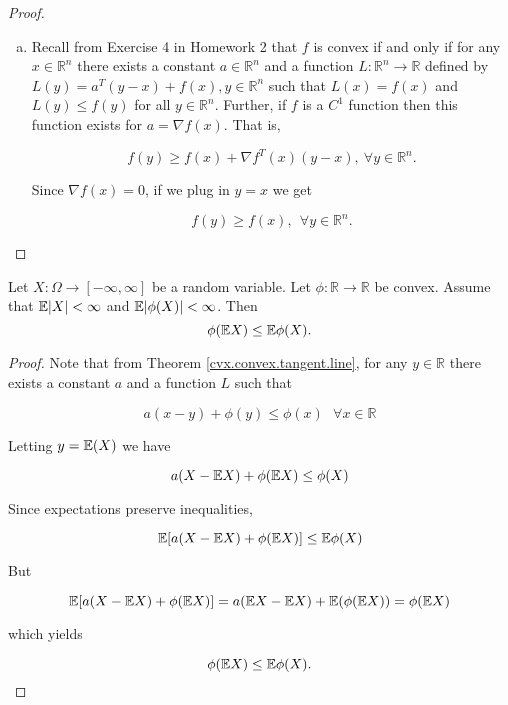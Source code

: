 \begin{proof}
\begin{enumerate}[(a)]
%


\item Recall from Exercise 4 in Homework 2 that \(f\) is convex if and only if for any \( x\in \mathbb{R}^n\) there exists a constant \(a \in \mathbb{R}^n\) and a function \(L:\mathbb{R}^n \to \mathbb{R}\) defined by \(L(y) = a^T(y-x) + f(x), y \in \mathbb{R}^n\) such that \(L(x) = f(x)\) and \(L(y) \leq f(y)\) for all \(y \in \mathbb{R}^n\). Further, if \(f\) is a \(C^1\) function then this function exists for \(a = \nabla f(x)\). That is,

\[
f(y) \geq f(x) + \nabla f^T(x)(y-x), \ \forall y \in \mathbb{R}^n.
\]

Since \(\nabla f(x) = 0\), if we plug in \(y= x\) we get

\[
f(y) \geq f(x), \ \ \forall y \in \mathbb{R}^n.
\]

\end{enumerate}

\end{proof}


\begin{theorem}\label{cvx.jensen.general}Let $X:\Omega\to[-\infty,\infty]$ be a random variable.  Let $\phi:\mathbb{R}\to\mathbb{R}$ be convex.  Assume that $\mathbb{E}|X|<\infty$ and $\mathbb{E}|\phi(X)|<\infty$.  Then
$$\phi(\mathbb{E} X)\leq \mathbb{E} \phi(X).$$
\end{theorem}

\begin{proof}Note that from Theorem \ref{cvx.convex.tangent.line}, for any \(y \in \mathbb{R}\) there exists a constant \(a\) and a function \(L\) such that

\[
a(x-y)+\phi(y) \leq \phi(x) \ \ \ \forall x \in \mathbb{R}
\]

Letting \(y = \mathbb{E}(X)\) we have

\[
a (X-\mathbb{E} X)+\phi(\mathbb{E} X) \leq \phi(X)
\]

Since expectations preserve inequalities,

\[
\mathbb{E}[a (X-\mathbb{E} X)+\phi(\mathbb{E} X)] \leq \mathbb{E} \phi(X)
\]

But

\[
\mathbb{E}[a(X-\mathbb{E} X)+\phi(\mathbb{E} X)]  = a(\mathbb{E} X - \mathbb{E} X) + \mathbb{E}(\phi(\mathbb{E} X)) = \phi(\mathbb{E} X)
\]

which yields

\[
\phi( \mathbb{E} X) \leq \mathbb{E} \phi(X).
\]

\end{proof}

